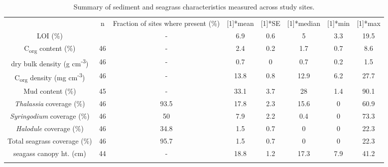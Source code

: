 \begin{table}[htbp]
  \centering
  \caption{Summary of sediment and seagrass characteristics measured across study sites.}
    \begin{tabular}{cccccccc}
\hline\noalign{\smallskip}

          & \multicolumn{1}{c}{\multirow{2}[1]{*}{n}}     & \multicolumn{1}{p{8em}}{Fraction of sites where present (\%)} & \multicolumn{1}{p{4em}}{\centering \multirow{2}[1]{*}{mean}} & \multicolumn{1}{p{4em}}{\centering \multirow{2}[1]{*}{SE}} & \multicolumn{1}{p{4em}}{\centering \multirow{2}[1]{*}{median}} & \multicolumn{1}{p{4em}}{\centering \multirow{2}[1]{*}{min}}   & \multicolumn{1}{p{4em}}{\centering \multirow{2}[1]{*}{max}} \\
    \noalign{\smallskip}\hline\noalign{\smallskip}

    LOI (\%) & 46    & -     & 6.9   & 0.6   & 5     & 3.3   & 19.5 \\

    C\textsubscript{org} content (\%) & 46    & -     & 2.4   & 0.2   & 1.7   & 0.7   & 8.6 \\

    dry bulk density (g cm\textsuperscript{-3}) & 46    & -     & 0.7   & 0     & 0.7   & 0.2   & 1.5 \\

    C\textsubscript{org} density (mg cm\textsuperscript{-3}) & 46    & -     & 13.8  & 0.8   & 12.9  & 6.2   & 27.7 \\

    Mud content (\%) & 45    & -     & 33.1  & 3.7   & 28    & 1.4   & 90.1 \\

    \textit{Thalassia} coverage (\%) & 46    & 93.5  & 17.8  & 2.3   & 15.6  & 0     & 60.9 \\

    \textit{Syringodium} coverage (\%) & 46    & 50    & 7.9   & 2.2   & 0.4   & 0     & 73.3 \\

    \textit{Halodule} coverage (\%) & 46    & 34.8  & 1.5   & 0.7   & 0     & 0     & 22.3 \\

    Total seagrass coverage (\%) & 46    & 95.7  & 1.5   & 0.7   & 0     & 0     & 22.3 \\

    seagass canopy ht. (cm) & 44    & -     & 18.8  & 1.2   & 17.3  & 7.9   & 41.2 \\
        \noalign{\smallskip}\hline\noalign{\smallskip}
    \end{tabular}%
  \label{tab:addlabel}%
\end{table}%


